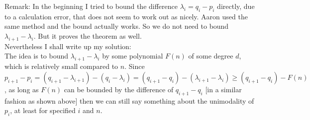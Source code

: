 \documentclass[12pt]{article}
\newcommand{\dstyle}{\displaystyle}
\newcommand{\1}{\mathbb{I}}
\theoremstyle{definition}
\theoremstyle{definition}
\theoremstyle{definition}
\theoremstyle{definition}
\theoremstyle{definition}
\theoremstyle{definition}
\begin{document}
\begin{comment}
First let us consider an ideal case, where we can bound $\lambda_i = q_i - p_i$.

\lemma Let $G$ be a subgroup of $S_n$, and let $p_i, q_i, \lambda_i$ be defined as above. Suppose that $\lambda_i = q_i - p_i \le n/2$, then $p_i$ is unimodal. 

\begin{proof} We prove the lemma for sufficiently large $n$ and $i$, we require $n\ge 7$ and $i \ge 3$.  We want to show that $p_i \ge p_{i-1}$ for $2 \le i \le (n+1)/2$. Note that $p_1 = 1$, so only need to show the claim for $3 \le i$. 

First consider when $3 \le i \le  n/2$.  From lemma \ref{020602}, we only need to prove that $q_i - q_{i-1} \ge n/2$, which would imply that $p_i \ge q_i - n/2 \ge q_{i-1}  \ge p_{i-1}$. 

Recall that $q_i =\dstyle {n-1 \choose i - 1}$, so $$q_i - q_{i-1} = \frac{(n-1)!}{(i-1)! (n-i)!} - \frac{(n-1)!}{(i-1)!(n-i+1)!}= {n \choose i -1} \frac{n-2i +2}{n} $$

Note that $n - 2i \ge 0$ and $i \ge 3$ by assumption, so $$q_i - q_{i-1} \ge {n \choose i -1} \cdot \frac{2}{n} \ge {n \choose 2} \cdot \frac{2}{n} = n-1 \ge \frac{n}{2}.$$

The remaining case is when $n$ is odd and $k = (n+1)/2$. By assumption we know that $k \ge 4$. This time we have   
$$q_k - q_{k-1} \ge {n \choose k -1} \cdot \frac{2}{n} \ge {n \choose 3} \cdot \frac{2}{n} = \frac{(n-1)(n-2)}{6} \ge \frac{n}{2}.$$
This concludes the unimodality of $p_i$ for this specific case.

\end{proof}

\end{comment}


Remark: In the beginning I tried to bound the difference $\lambda_i = q_i - p_i$ directly, due to a calculation error, that does not seem to work out as nicely. Aaron used the same method and the bound actually works. So we do not need to bound $\lambda_{i+1} - \lambda_i$. But it proves the theorem as well. \\ 

Nevertheless I shall write up my solution: \\

The idea is to bound $\lambda_{i+1} - \lambda_{i}$ by some polynomial $F(n)$ of some degree $d$, which is relatively small compared to $n$.  Since
$p_{i+1} - p_{i} = (q_{i+1} - \lambda_{i+1}) - (q_i - \lambda_i) = (q_{i+1} - q_i) - (\lambda_{i+1}- \lambda_i) \ge ( q_{i+1} - q_{i} ) - F(n)$, as long as $F(n)$ can be bounded by the difference of $q_{i+1} - q_{i}$ [in a similar fashion as shown above] then we can still say something about the unimodality of $p_i$, at least for specified $i$ and $n$. 
\end{document}
